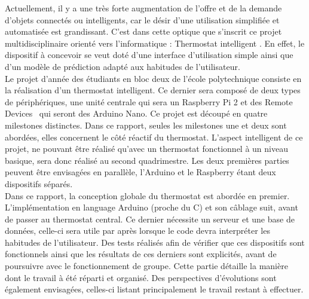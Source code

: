 \documentclass[11pt,a4paper,11pt]{report}
\begin{document}
Actuellement, il y a une très forte augmentation de l’offre et de la demande d’objets connectés ou intelligents, car le désir d’une utilisation simplifiée et automatisée est grandissant. C’est dans cette optique que s’inscrit ce projet multidisciplinaire orienté vers l’informatique : \og Thermostat intelligent \fg. En effet, le dispositif à concevoir se veut doté d’une interface d’utilisation simple ainsi que d’un modèle de prédiction adapté aux habitudes de l’utilisateur.\\
Le projet d’année des étudiants en bloc deux de l’école polytechnique consiste en la réalisation d’un thermostat intelligent. Ce dernier sera composé de deux types de périphériques, une unité centrale qui sera un Raspberry Pi 2 et des \og Remote Devices \fg ~qui seront des Arduino Nano. Ce projet est découpé en quatre milestones distinctes. Dans ce rapport, seules les milestones une et deux sont abordées, elles concernent le côté réactif du thermostat. L’aspect intelligent de ce projet, ne pouvant être réalisé qu’avec un thermostat fonctionnel à un niveau basique, sera donc réalisé au second quadrimestre. Les deux premières parties peuvent être envisagées en parallèle, l’Arduino et le Raspberry étant deux dispositifs séparés.\\

Dans ce rapport, la conception globale du thermostat est abordée en premier. L'implémentation en language Arduino (proche du C) et son câblage suit, avant de passer au thermostat central. Ce dernier nécessite un serveur et une base de données, celle-ci sera utile par après lorsque le code devra interpréter les habitudes de l'utilisateur. Des tests réalisés afin de vérifier que ces dispositifs sont fonctionnels ainsi que les résultats de ces derniers sont explicités, avant de poursuivre avec le fonctionnement de groupe. Cette  partie détaille la manière dont le travail à été réparti et organisé. Des perspectives d'évolutions sont également envisagées, celles-ci listant principalement le travail restant à effectuer.\\

\newpage
\end{document}
